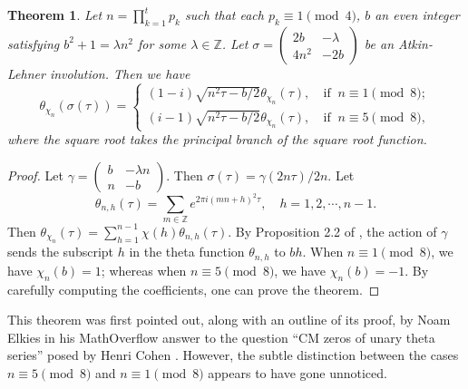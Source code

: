 \documentclass[11pt, reqno]{amsart}
\theoremstyle{plain}
\newtheorem{theorem}{Theorem}[section]
\theoremstyle{definition}
\numberwithin{equation}{section}
\begin{document}
\begin{theorem}\label{Theorem8.0}
Let $n=\prod_{k=1}^t p_k$ such that  each $p_k\equiv 1\pmod 4$,  $b$ an even integer satisfying $b^2+1=\lambda {n^2}$ for some $\lambda\in \mathbb{Z}$.  Let $\sigma=\begin{pmatrix}
2b&-\lambda\\
4n^2&-2b
\end{pmatrix}
$ be an Atkin-Lehner involution. Then we have 
\[
\theta_{\chi_n}(\sigma(\tau))=\begin{cases}
(1-i)\sqrt{n^2\tau-{b}/{2}} \theta_{\chi_n}(\tau),&\ \text{if }\ 
n\equiv 1\pmod 8;  \\
(i-1)\sqrt{n^2\tau-{b}/{2}}\theta_{\chi_n}(\tau),&\ \text{if }\ 
n\equiv 5\pmod 8,
\end{cases}
\]
where the square root takes the principal branch of the square root function. 
\end{theorem}
\begin{proof}Let  $\gamma=\begin{pmatrix}
b&-\lambda n\\
n&-b
\end{pmatrix}
$.  Then $\sigma(\tau)=\gamma({2n\tau})/2n$. 
Let $$\theta_{n,h}(\tau)=\sum_{m\in\mathbb Z} e^{2\pi i(mn+h)^2\tau}, \quad h=1,2,\cdots, {n-1}.$$
Then $\theta_{\chi_n}(\tau)=\sum_{h=1}^{{n-1}}\chi(h)\theta_{n,h}(\tau)$.  By Proposition 2.2 of \cite{B}, the action of $\gamma$  sends the subscript $h$ in the theta function $\theta_{n,h}$ to $bh$. When $n \equiv 1 \pmod{8}$, we have $\chi_n(b) = 1$; whereas when $n \equiv 5 \pmod{8}$, we have $\chi_n(b) = -1$.
By carefully computing the coefficients, one can prove
the theorem. 
\end{proof}

This theorem was first pointed out, along with an outline of its proof, by Noam Elkies in his MathOverflow answer to the question “CM zeros of unary theta series” posed by Henri Cohen \cite{Cohen}.  However, the subtle distinction between the cases $n \equiv 5\pmod 8$ and $n \equiv 1\pmod 8$  appears to have gone unnoticed.
\end{document}
